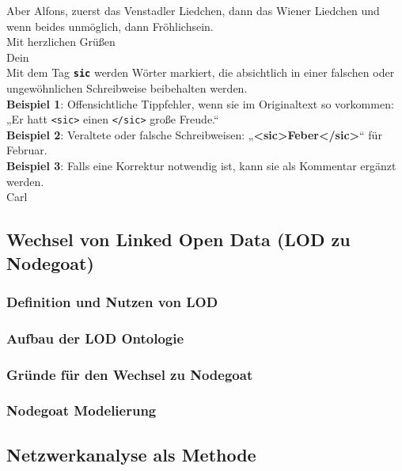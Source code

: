 \documentclass[12pt, a4paper, ngerman, bidi=default]{article}
\begin{document}
Aber Alfons, zuerst das Venstadler Liedchen, dann das Wiener Liedchen und wenn beides unmöglich, dann Fröhlichsein.\\

Mit herzlichen Grüßen\\
Dein\\


Mit dem Tag \texttt{\texttt{\textbf{{\colorbox{sic}{sic}}}}} werden Wörter markiert, die absichtlich in einer falschen oder ungewöhnlichen Schreibweise beibehalten werden. \\

\textbf{ Beispiel 1}: Offensichtliche Tippfehler, wenn sie im Originaltext so vorkommen:  
„Er hatt \texttt{\textless sic\textgreater} einen \texttt{\textless /sic\textgreater} große Freude.“\\
\textbf{ Beispiel 2}: Veraltete oder falsche Schreibweisen: „\textbf{\textless sic\textgreater Feber\textless /sic\textgreater}“ für Februar.\\
\textbf{\textbf{ Beispiel 3}}: Falls eine Korrektur notwendig ist, kann sie als Kommentar ergänzt werden. \\
Carl\\







      \subsection{Wechsel von Linked Open Data (LOD zu Nodegoat)}
        \subsubsection{Definition und Nutzen von LOD}
        \subsubsection{Aufbau der LOD Ontologie}
        \subsubsection{Gründe für den Wechsel zu Nodegoat}
        \subsubsection{Nodegoat Modelierung}


  \subsection{Netzwerkanalyse als Methode}
\end{document}
